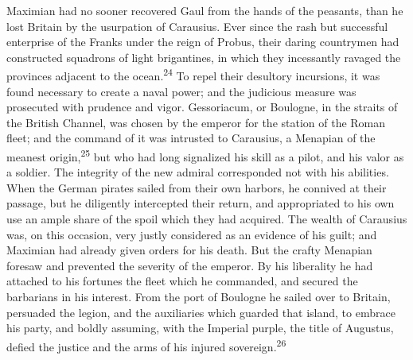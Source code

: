 Maximian had no sooner recovered Gaul from the hands of the
peasants, than he lost Britain by the usurpation of Carausius.
Ever since the rash but successful enterprise of the Franks under
the reign of Probus, their daring countrymen had constructed
squadrons of light brigantines, in which they incessantly ravaged
the provinces adjacent to the ocean.\textsuperscript{24} To repel their desultory
incursions, it was found necessary to create a naval power; and
the judicious measure was prosecuted with prudence and vigor.
Gessoriacum, or Boulogne, in the straits of the British Channel,
was chosen by the emperor for the station of the Roman fleet; and
the command of it was intrusted to Carausius, a Menapian of the
meanest origin,\textsuperscript{25} but who had long signalized his skill as a
pilot, and his valor as a soldier. The integrity of the new
admiral corresponded not with his abilities. When the German
pirates sailed from their own harbors, he connived at their
passage, but he diligently intercepted their return, and
appropriated to his own use an ample share of the spoil which
they had acquired. The wealth of Carausius was, on this occasion,
very justly considered as an evidence of his guilt; and Maximian
had already given orders for his death. But the crafty Menapian
foresaw and prevented the severity of the emperor. By his
liberality he had attached to his fortunes the fleet which he
commanded, and secured the barbarians in his interest. From the
port of Boulogne he sailed over to Britain, persuaded the legion,
and the auxiliaries which guarded that island, to embrace his
party, and boldly assuming, with the Imperial purple, the title
of Augustus, defied the justice and the arms of his injured
sovereign.\textsuperscript{26}



